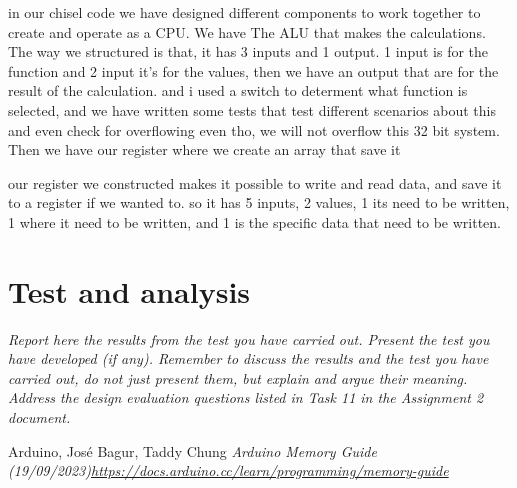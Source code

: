 \documentclass[a4paper, english]{article}
\numberwithin{equation}{section}
\begin{document}
in our chisel code we have designed different components to work together to create and operate as a CPU.
We have The ALU that makes the calculations. The way we structured is that, it has 3 inputs and 1 output. 1 input is for the function and 2 input it's for the values, then we have an output that are for the result of the calculation. and i used a switch to determent what function is selected, and we have written some tests that test different scenarios about this and even check for overflowing even tho, we will not overflow this 32 bit system. 
Then we have our register where we create an array that save it 

our register we constructed makes it possible to write and read data, and save it to a register if we wanted to. so it has 5 inputs, 2 values, 1 its need to be written, 1 where it need to be written, and 1 is the specific data that need to be written. 






\section{Test and analysis}
\emph{Report here the results from the test you have carried out. Present the test you have developed (if any). Remember to discuss the results and the test you have carried out, do not just present them, but explain and argue their meaning. Address the design evaluation questions listed in Task 11 in the Assignment 2 document.}









\begin{thebibliography}{1}
    Arduino, José Bagur, Taddy Chung \emph{Arduino Memory Guide (19/09/2023)\newline \href{https://docs.arduino.cc/learn/programming/memory-guide}{https://docs.arduino.cc/learn/programming/memory-guide}}
\end{thebibliography}

%
%




%
\end{document}
